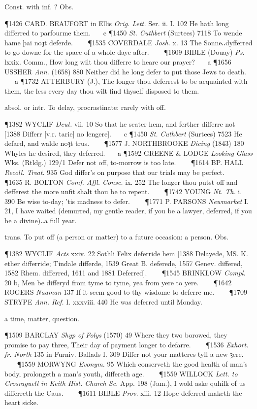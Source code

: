 \begin{description}[wide, labelwidth=!, labelindent=0pt]
\begin{myenumerate}
 Const. with inf. ? Obs.

\P 1426 CARD. BEAUFORT in Ellis \textit{Orig. Lett.} Ser. ii. I. 102 He hath long differred to parfourme them.    c 
\P 1450  \textit{St. Cuthbert} (Surtees) 7118 To wende hame þai noȝt deferde.    
\P 1535 COVERDALE  \textit{Josh.} x. 13 The Sonne‥dyfferred to go downe for the space of a whole daye after.    
\P 1609 BIBLE (Douay)  \textit{Ps.} lxxix. Comm., How long wilt thou differre to heare our prayer?    a 
\P 1656 USSHER  \textit{Ann.} (1658) 880 Neither did he long defer to put those Jews to death.    a 
\P 1732 ATTERBURY  (J.), The longer thou deferrest to be acquainted with them, the less every day thou wilt find thyself disposed to them.

 absol. or intr. To delay, procrastinate: rarely with off.

\P 1382 WYCLIF  \textit{Deut.} vii. 10 So that he scater hem, and ferther differre not [1388 Differr  [v.r. tarie] no lengere].    c 
\P 1450  \textit{St. Cuthbert} (Surtees) 7523 He defard, and walde noȝt trus.    
\P 1577 J. NORTHBROOKE  \textit{Dicing} (1843) 180 Whyles he desired, they deferred.    a 
\P 1592 GREENE \& LODGE  \textit{Looking Glass} Wks. (Rtldg.) 129/1 Defer not off, to-morrow is too late.    
\P 1614 BP. HALL  \textit{Recoll. Treat.} 935 God differ's on purpose that our trials may be perfect.    
\P 1635 R. BOLTON  \textit{Comf. Affl. Consc.} ix. 252 The longer thou putst off and defferest the more unfit shalt thou be to repent.    
\P 1742 YOUNG  \textit{Nt. Th.} i. 390 Be wise to-day; 'tis madness to defer.    
\P 1771 P. PARSONS  \textit{Newmarket} I. 21, I have waited (demurred, my gentle reader, if you be a lawyer, deferred, if you be a divine)‥a full year.

 trans. To put off (a person or matter) to a future occasion:  a person. Obs.

\P 1382 WYCLIF  \textit{Acts} xxiv. 22 Sothli Felix deferride hem [1388 Delayede,  MS. K. ether differride; Tindale differde, 1539 Great B. deferede, 1557 Genev. differed, 1582 Rhem. differred, 1611 and 1881 Deferred].    
\P 1545 BRINKLOW  \textit{Compl.} 20 b, Men be differyd from tyme to tyme, yea from yere to yere.    
\P 1642 ROGERS  \textit{Naaman} 137 If it seem good to thy wisdome to deferre me.    
\P 1709 STRYPE  \textit{Ann. Ref.} I. xxxviii. 440 He was deferred until Monday.

 a time, matter, question.

\P 1509 BARCLAY  \textit{Shyp of Folys} (1570) 49 Where they two borowed, they promise to pay three, Their day of payment longer to defarre.    
\P 1536 \textit{Exhort.  fr. North} 135 in Furniv. Ballads I. 309 Differ not your matteres tyll a new ȝere.    
\P 1559 MORWYNG  \textit{Evonym.} 95 Which conserveth the good health of man's body, prolongeth a man's youth, differeth age.    
\P 1559 WILLOCK  \textit{Lett. to Crosraguell in Keith Hist. Church Sc.} App. 198 (Jam.), I wold aske quhilk of us differreth the Caus.    
\P 1611 BIBLE  \textit{Prov.} xiii. 12 Hope deferred maketh the heart sicke.


\end{myenumerate}
\end{description}

